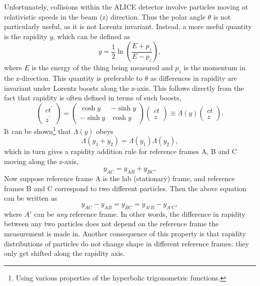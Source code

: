 Unfortunately, collisions within the ALICE detector involve particles moving at relativistic speeds in the beam (z) direction. Thus the polar angle $\theta$ is not particularly useful, as it is not Lorentz invariant. Instead, a more useful quantity is the rapidity $y$, which can be defined as
\begin{equation}
    y = \frac{1}{2} \ln \left( \frac{E + p_{z}}{E - p_{z}} \right),
\end{equation}
where $E$ is the energy of the thing being measured and $p_{z}$ is the momentum in the z-direction. This quantity is preferable to $\theta$ as differences in rapidity are invariant under Lorentz boosts along the z-axis. This follows directly from the fact that rapidity is often defined in terms of such boosts,
\begin{equation}
    \left(\begin{array}{c}
        c t^{\prime} \\
        z^{\prime}
        \end{array}\right)=\left(\begin{array}{cc}
        \cosh y & -\sinh y \\
        -\sinh y & \cosh y
        \end{array}\right)\left(\begin{array}{c}
        c t \\
        z
        \end{array}\right) \equiv \Lambda(y)\left(\begin{array}{c}
        c t \\
        z
        \end{array}\right).
\end{equation}
It can be shown\footnote{Using various properties of the hyperbolic trigonometric functions.} that $\Lambda(y)$ obeys
\begin{equation}
    \Lambda(y_1 + y_2) = \Lambda(y_1)\Lambda(y_2),
\end{equation}
which in turn gives a rapidity addition rule for reference frames A, B and C moving along the z-axis,
\begin{equation}
    y_{AC} = y_{AB} + y_{BC}.
\end{equation}
Now suppose reference frame A is the lab (stationary) frame, and reference frames B and C correspond to two different particles. Then the above equation can be written as
\begin{equation}
    y_{AC} - y_{AB} = y_{BC} = y_{A'B} - y_{A'C},
\end{equation}
where $A'$ can be \textit{any} reference frame. In other words, the difference in rapidity between any two particles does not depend on the reference frame the measurement is made in. Another consequence of this property is that rapidity distributions of particles do not change shape in different reference frames: they only get shifted along the rapidity axis.

